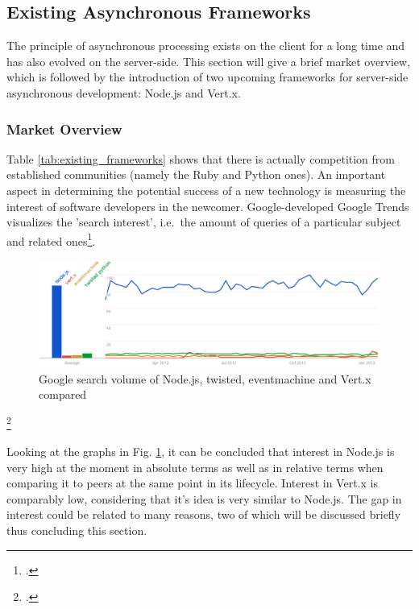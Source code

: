 \subsection{Existing Asynchronous Frameworks}
\label{existing_frameworks}
The principle of asynchronous processing exists on the client for a long time and has also evolved
on the server-side. This section will give a brief market overview, which is followed by the
introduction of two upcoming frameworks for server-side asynchronous
development: Node.js and Vert.x.


\subsubsection{Market Overview}
\label{frameworks_overview}
\FloatBarrier
Table \ref{tab:existing_frameworks} shows that there is actually competition
from established communities (namely the Ruby and Python ones). An important
aspect in determining the potential success of a new technology is measuring the
interest of software developers in the newcomer. Google-developed Google Trends
visualizes the 'search interest', i.e.\ the amount of queries of a particular
subject and related ones\footcite[Cf.][]{g_trends}.


\begin{figure}[hbtp]
\centering
\includegraphics[width=\textwidth]{img/googletrend_all.png}
\caption[Google search volume of Node.js, twisted, eventmachine and Vert.x compared]{Google search volume of Node.js, twisted, eventmachine and Vert.x compared}
\label{img_googletrend_all}
\end{figure}
\footcitetext[Cf.][]{g_trends}

Looking at the graphs in Fig. \ref{img_googletrend_all}, it can be
concluded that interest in Node.js is very high at the moment in absolute terms as well
as in relative terms when comparing it to peers at the same point in its lifecycle.
Interest in Vert.x is comparably low, considering that it's idea is very similar to Node.js.
The gap in interest could be related to many reasons, two of which will be discussed 
briefly thus concluding this section.

